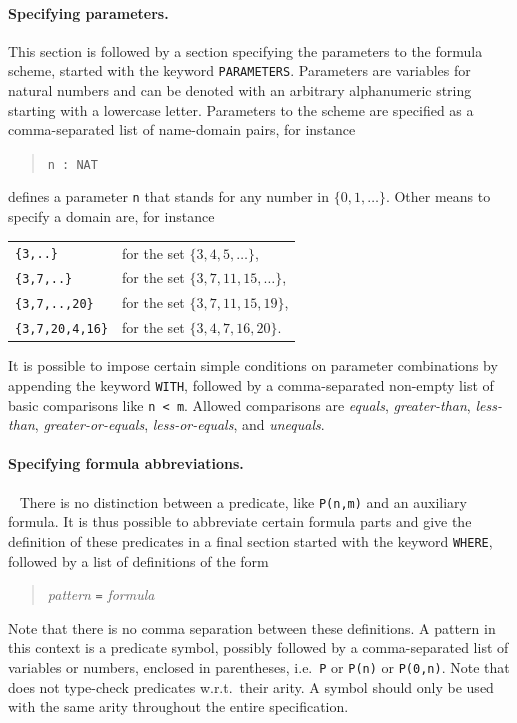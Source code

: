 \documentclass[twoside]{article}
\begin{document}
\paragraph*{Specifying parameters.}
This section is followed by a section specifying the parameters to the formula scheme, started with the keyword \texttt{PARAMETERS}.
Parameters are variables for natural numbers and can be denoted with an arbitrary alphanumeric string starting with a lowercase letter.
Parameters to the scheme are specified as a comma-separated list of name-domain pairs, for instance 
\begin{quote}
\texttt{n : NAT}   
\end{quote}
defines a parameter \texttt{n} that stands for any number in $\{0,1,\ldots\}$. Other means to specify a domain are, for instance
\begin{center}
\begin{tabular}{ll}
\texttt{\{3,..\}} & for the set $\{3,4,5,\ldots\}$, \\
\texttt{\{3,7,..\}} & for the set $\{3,7,11,15,\ldots\}$, \\
\texttt{\{3,7,..,20\}} & for the set $\{3,7,11,15,19\}$, \\
\texttt{\{3,7,20,4,16\}} & for the set $\{3,4,7,16,20\}$.
\end{tabular}
\end{center} 
It is possible to impose certain simple conditions on parameter combinations by appending the keyword \texttt{WITH}, followed by
a comma-separated non-empty list of basic comparisons like \texttt{n < m}. Allowed comparisons are \emph{equals}, \emph{greater-than}, 
\emph{less-than}, \emph{greater-or-equals}, \emph{less-or-equals}, and \emph{unequals}.

\paragraph*{Specifying formula abbreviations.} 
There is no distinction between a predicate, like \texttt{P(n,m)} and an auxiliary formula. It is thus possible to abbreviate certain
formula parts and give the definition of these predicates in a final section started with the keyword \texttt{WHERE}, followed by
a list of definitions of the form 
\begin{quote}
\emph{pattern} \texttt{=} \emph{formula}
\end{quote}
Note that there is no comma separation between these definitions. A pattern in this context is a predicate symbol, possibly followed
by a comma-separated list of variables or numbers, enclosed in parentheses, i.e.\ \texttt{P} or \texttt{P(n)} or \texttt{P(0,n)}.
Note that \DiMo does not type-check predicates w.r.t.\ their arity. A symbol should only be used with the same arity throughout the
entire specification.
\end{document}
